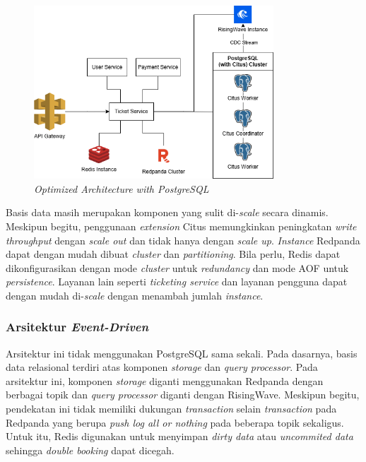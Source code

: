 \begin{figure}[ht]
  \centering
  \includegraphics[width=0.8\textwidth]{resources/chapter-3/architecture-optimized.png}
  \caption{\textit{Optimized Architecture with PostgreSQL}}
  \label{fig:optimized-architecture}
\end{figure}

Basis data masih merupakan komponen yang sulit di-\textit{scale} secara dinamis. Meskipun begitu, penggunaan \textit{extension} Citus memungkinkan peningkatan \textit{write throughput} dengan \textit{scale out} dan tidak hanya dengan \textit{scale up}. \textit{Instance} Redpanda dapat dengan mudah dibuat \textit{cluster} dan \textit{partitioning}. Bila perlu, Redis dapat dikonfigurasikan dengan mode \textit{cluster} untuk \textit{redundancy} dan mode AOF untuk \textit{persistence}. Layanan lain seperti \textit{ticketing service} dan layanan pengguna dapat dengan mudah di-\textit{scale} dengan menambah jumlah \textit{instance}.

\subsubsection{Arsitektur \textit{Event-Driven}}

Arsitektur ini tidak menggunakan PostgreSQL sama sekali. Pada dasarnya, basis data relasional terdiri atas komponen \textit{storage} dan \textit{query processor}. Pada arsitektur ini, komponen \textit{storage} diganti menggunakan Redpanda dengan berbagai topik dan \textit{query processor} diganti dengan RisingWave. Meskipun begitu, pendekatan ini tidak memiliki dukungan \textit{transaction} selain \textit{transaction} pada Redpanda yang berupa \textit{push log all or nothing} pada beberapa topik sekaligus. Untuk itu, Redis digunakan untuk menyimpan \textit{dirty data} atau \textit{uncommited data} sehingga \textit{double booking} dapat dicegah.

